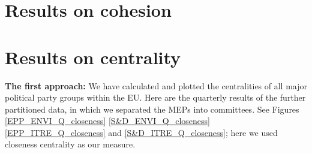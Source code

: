 \documentclass[lettersize,journal]{IEEEtran}
\begin{document}
\section{Results on cohesion} \label{sec:results_coh}

\section{Results on centrality} \label{sec:results}


\textbf{The first approach:} We have calculated and plotted the centralities of all major political party groups within the EU. Here are the quarterly results of the further partitioned data, in which we separated the MEPs into committees. See Figures \ref{EPP_ENVI_Q_closeness} \ref{S&D_ENVI_Q_closeness} \ref{EPP_ITRE_Q_closeness} and \ref{S&D_ITRE_Q_closeness}; here we used closeness centrality as our measure. 
\end{document}
